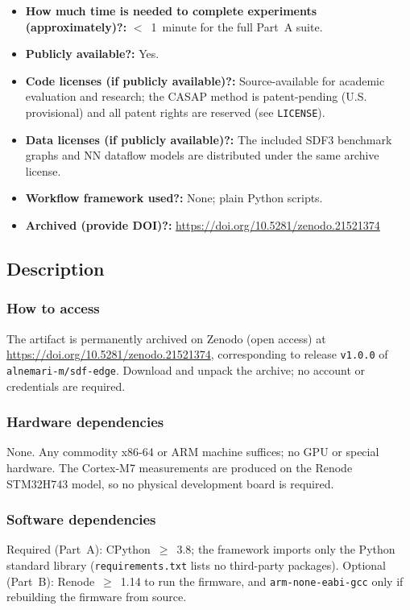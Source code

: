 \documentclass[10pt]{article}
\begin{document}
{\begin{itemize}
  \item {\bf How much time is needed to complete experiments (approximately)?: }
        $<$~1~minute for the full Part~A suite.
  \item {\bf Publicly available?: } Yes.
  \item {\bf Code licenses (if publicly available)?: } Source-available for
        academic evaluation and research; the CASAP method is patent-pending
        (U.S. provisional) and all patent rights are reserved (see
        \texttt{LICENSE}).
  \item {\bf Data licenses (if publicly available)?: } The included SDF3
        benchmark graphs and NN dataflow models are distributed under the same
        archive license.
  \item {\bf Workflow framework used?: } None; plain Python scripts.
  \item {\bf Archived (provide DOI)?: } \url{https://doi.org/10.5281/zenodo.21521374}
\end{itemize}
}

\subsection{Description}

\subsubsection{How to access}
The artifact is permanently archived on Zenodo (open access) at
\url{https://doi.org/10.5281/zenodo.21521374}, corresponding to release
\texttt{v1.0.0} of \texttt{alnemari-m/sdf-edge}. Download and unpack the
archive; no account or credentials are required.

\subsubsection{Hardware dependencies}
None. Any commodity x86-64 or ARM machine suffices; no GPU or special hardware.
The Cortex-M7 measurements are produced on the Renode STM32H743 model, so no
physical development board is required.

\subsubsection{Software dependencies}
Required (Part~A): CPython~$\geq$~3.8; the framework imports only the Python
standard library (\texttt{requirements.txt} lists no third-party packages).
Optional (Part~B): Renode~$\geq$~1.14 to run the firmware, and
\texttt{arm-none-eabi-gcc} only if rebuilding the firmware from source.
\end{document}
